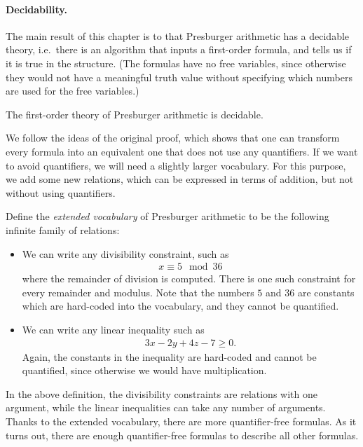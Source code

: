 \paragraph*{Decidability.} The main result of this chapter is to  that Presburger arithmetic has a decidable theory, i.e.~there is an algorithm that inputs a first-order formula, and tells us if it is true in the structure. (The formulas have no free variables, since otherwise they would not have a meaningful truth value without specifying which numbers are used for the free variables.)

\begin{theorem}\label{thm:presburger-decidable}
The first-order theory of Presburger arithmetic is decidable.
\end{theorem}

We follow the ideas of the original proof, which shows that one can transform every formula into an equivalent one that does not use any quantifiers. If we want to avoid quantifiers, we will need a slightly larger vocabulary. For this purpose, we add some new relations, which can be expressed in terms of addition, but not without using quantifiers. 

\begin{definition}
	Define the \emph{extended vocabulary} of Presburger arithmetic to be the following infinite family of relations: 
	\begin{itemize}
		\item We can write any divisibility constraint, such as 
		\begin{align*}
		x \equiv 5 \mod 36
		\end{align*}
		where the remainder of division is computed. There is one such constraint for every remainder and modulus. Note that the numbers $5$ and $36$ are constants which are hard-coded into the vocabulary, and they cannot be quantified.
	
		\item We can write any linear inequality such as 
		\begin{align*}
		3x - 2y + 4z - 7 \ge 0.
		\end{align*}
		Again, the constants in the inequality are hard-coded and cannot be quantified, since otherwise we would have multiplication.
	\end{itemize}
	\end{definition}

In the above definition, the divisibility constraints are relations with one argument, while the linear inequalities can take any number of arguments.
Thanks to the extended vocabulary, there are more quantifier-free formulas. 
As it turns out, there are enough quantifier-free formulas to describe all other formulas.


